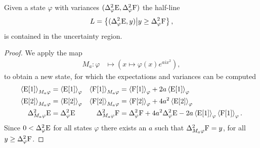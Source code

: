 \begin{lem}\label{lem:box-ur-half-line-contained}
Given a state $\varphi$ with variances $(\var[\varphi]{\ope}, \var[\varphi]{\opf})$ the half-line
\begin{align}
  L = \left\{(\var[\varphi]{\ope}, y)\middle| y \geq \var[\varphi]{\opf}\right\},
\end{align}
is contained in the uncertainty region.
\end{lem}
\begin{proof}
We apply the map 
\begin{align}
  M_a : \varphi &\mapsto \left(x \mapsto \varphi(x) e^{a i x^2}\right),
\end{align}
to obtain a new state, for which the expectations and variances can be computed
\begin{align}
  \expe{\ope[1]}{M_a\varphi}&= \expe{\ope[1]}{\varphi} & \expe{\opf[1]}{M_a\varphi} &= \expe{\opf[1]}{\varphi} + 2a\expe{\ope[1]}{\varphi}\\
  \expe{\ope[2]}{M_a\varphi}&= \expe{\ope[2]}{\varphi} & \expe{\opf[2]}{M_a\varphi} &= \expe{\opf[2]}{\varphi} + 4a^2\expe{\ope[2]}{\varphi}\\
  \var[M_a\varphi]{\ope} &= \var[\varphi]{\ope} & \var[M_a\varphi]{\opf} &= \var[\varphi]{\opf} + 4 a^2 \var[\varphi]{\ope} - 2a\expe{\ope[1]}{\varphi}\expe{\opf[1]}{\varphi}.
\end{align}
Since $0<\var[\varphi]{\ope}$ for all states $\varphi$ there exists an $a$ such that $\var[M_a\varphi]{\opf} = y$, for all $y \geq \var[\varphi]{\opf}$.
\end{proof}

